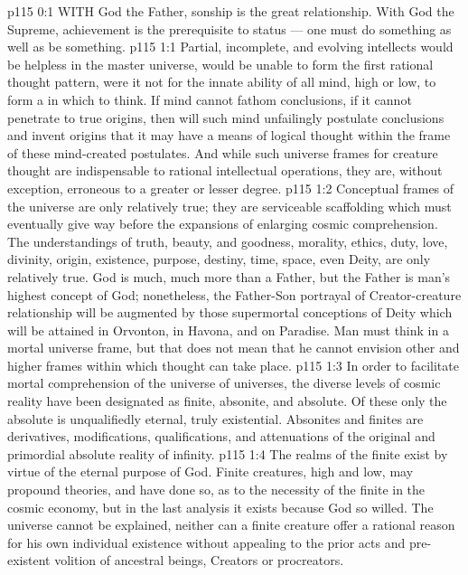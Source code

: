 \vs p115 0:1 WITH God the Father, sonship is the great relationship. With God the Supreme, achievement is the prerequisite to status --- one must do something as well as be something.
\vs p115 1:1 Partial, incomplete, and evolving intellects would be helpless in the master universe, would be unable to form the first rational thought pattern, were it not for the innate ability of all mind, high or low, to form a  in which to think. If mind cannot fathom conclusions, if it cannot penetrate to true origins, then will such mind unfailingly postulate conclusions and invent origins that it may have a means of logical thought within the frame of these mind\hyp{}created postulates. And while such universe frames for creature thought are indispensable to rational intellectual operations, they are, without exception, erroneous to a greater or lesser degree.
\vs p115 1:2 Conceptual frames of the universe are only relatively true; they are serviceable scaffolding which must eventually give way before the expansions of enlarging cosmic comprehension. The understandings of truth, beauty, and goodness, morality, ethics, duty, love, divinity, origin, existence, purpose, destiny, time, space, even Deity, are only relatively true. God is much, much more than a Father, but the Father is man’s highest concept of God; nonetheless, the Father\hyp{}Son portrayal of Creator\hyp{}creature relationship will be augmented by those supermortal conceptions of Deity which will be attained in Orvonton, in Havona, and on Paradise. Man must think in a mortal universe frame, but that does not mean that he cannot envision other and higher frames within which thought can take place.
\vs p115 1:3 In order to facilitate mortal comprehension of the universe of universes, the diverse levels of cosmic reality have been designated as finite, absonite, and absolute. Of these only the absolute is unqualifiedly eternal, truly existential. Absonites and finites are derivatives, modifications, qualifications, and attenuations of the original and primordial absolute reality of infinity.
\vs p115 1:4 The realms of the finite exist by virtue of the eternal purpose of God. Finite creatures, high and low, may propound theories, and have done so, as to the necessity of the finite in the cosmic economy, but in the last analysis it exists because God so willed. The universe cannot be explained, neither can a finite creature offer a rational reason for his own individual existence without appealing to the prior acts and pre\hyp{}existent volition of ancestral beings, Creators or procreators.

